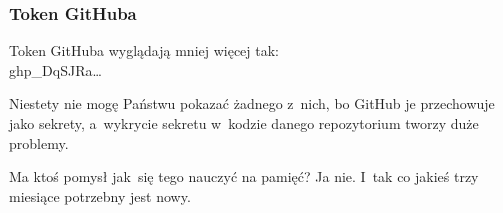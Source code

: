 \documentclass[10pt,t]{beamer}
\begin{document}
































\begin{frame}
  \frametitle{Token GitHuba}


  Token GitHuba wyglądają mniej więcej tak: \\
  ghp_DqSJRa\ldots

  Niestety nie mogę Państwu pokazać żadnego z~nich, bo GitHub je przechowuje
  jako sekrety, a~wykrycie sekretu w~kodzie danego repozytorium tworzy duże
  problemy.

  Ma ktoś pomysł jak~się tego nauczyć na pamięć? Ja nie. I~tak co jakieś
  trzy miesiące potrzebny jest nowy.

\end{frame}








\end{document}
